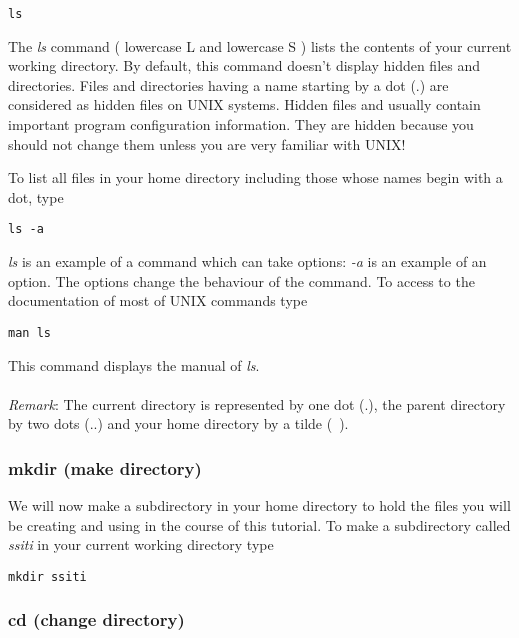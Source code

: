 \documentclass[two_sides]{my_article}
\begin{document}
\begin{lstlisting}[frame=lines, numbers=none]
ls
\end{lstlisting}

The \emph{ls} command ( lowercase L and lowercase S ) lists the contents of your current working directory.
By default, this command doesn't display hidden files and directories. Files and directories having a name starting by a dot (.) are considered as hidden files on UNIX systems. Hidden files and usually contain important program configuration information. They are hidden because you should not change them unless you are very familiar with UNIX!

To list all files in your home directory including those whose names begin with a dot, type

\begin{lstlisting}[frame=lines, numbers=none]
ls -a
\end{lstlisting}

\emph{ls} is an example of a command which can take options: \emph{-a} is an example of an option. The options change the behaviour of the command. To access to the documentation of most of UNIX commands type

\begin{lstlisting}[frame=lines, numbers=none]
man ls
\end{lstlisting}

This command displays the manual of \emph{ls}.
\paragraph{}
\emph{Remark}: The current directory is represented by one dot (.), the parent directory by two dots (..) and your home directory by a tilde (~).

\subsubsection{mkdir (make directory)}

We will now make a subdirectory in your home directory to hold the files you will be creating and using in the course of this tutorial. To make a subdirectory called \emph{ssiti} in your current working directory type

\begin{lstlisting}[frame=lines, numbers=none]
mkdir ssiti
\end{lstlisting}

\subsubsection{cd (change directory)}
\end{document}
